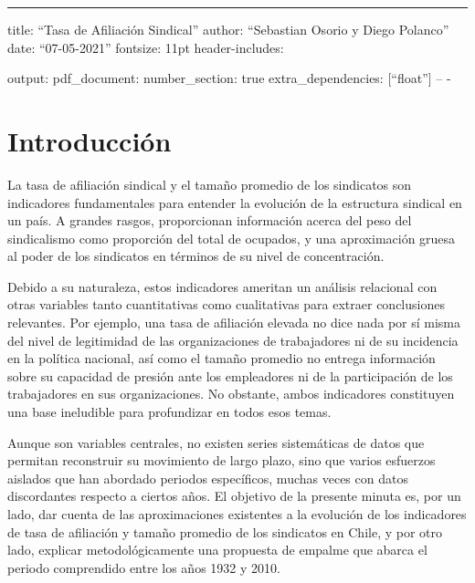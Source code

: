 \documentclass[
]{article}
\author{}
\date{\vspace{-2.5em}}
\begin{document}
\begin{center}\rule{0.5\linewidth}{0.5pt}\end{center}

title: ``Tasa de Afiliación Sindical'' author: ``Sebastian Osorio y
Diego Polanco'' date: ``07-05-2021'' fontsize: 11pt header-includes:

\usepackage{floatrow}
  \usepackage{float}

output: pdf\_document: number\_section: true extra\_dependencies:
{[}``float''{]} -- -

\renewcommand{\figurename}{Figura}
\renewcommand{\tablename}{Tabla}

\hypertarget{introducciuxf3n}{%
\section{Introducción}\label{introducciuxf3n}}

La tasa de afiliación sindical y el tamaño promedio de los sindicatos
son indicadores fundamentales para entender la evolución de la
estructura sindical en un país. A grandes rasgos, proporcionan
información acerca del peso del sindicalismo como proporción del total
de ocupados, y una aproximación gruesa al poder de los sindicatos en
términos de su nivel de concentración.

Debido a su naturaleza, estos indicadores ameritan un análisis
relacional con otras variables tanto cuantitativas como cualitativas
para extraer conclusiones relevantes. Por ejemplo, una tasa de
afiliación elevada no dice nada por sí misma del nivel de legitimidad de
las organizaciones de trabajadores ni de su incidencia en la política
nacional, así como el tamaño promedio no entrega información sobre su
capacidad de presión ante los empleadores ni de la participación de los
trabajadores en sus organizaciones. No obstante, ambos indicadores
constituyen una base ineludible para profundizar en todos esos temas.

Aunque son variables centrales, no existen series sistemáticas de datos
que permitan reconstruir su movimiento de largo plazo, sino que varios
esfuerzos aislados que han abordado periodos específicos, muchas veces
con datos discordantes respecto a ciertos años. El objetivo de la
presente minuta es, por un lado, dar cuenta de las aproximaciones
existentes a la evolución de los indicadores de tasa de afiliación y
tamaño promedio de los sindicatos en Chile, y por otro lado, explicar
metodológicamente una propuesta de empalme que abarca el periodo
comprendido entre los años 1932 y 2010.
\end{document}
